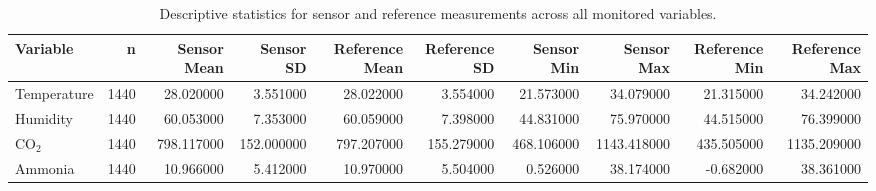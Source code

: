 \begin{table}
\caption{Descriptive statistics for sensor and reference measurements across all monitored variables.}
\label{tab:descriptive_stats}
\begin{tabular}{lrrrrrrrrr}
\toprule
Variable & n & Sensor Mean & Sensor SD & Reference Mean & Reference SD & Sensor Min & Sensor Max & Reference Min & Reference Max \\
\midrule
Temperature & 1440 & 28.020000 & 3.551000 & 28.022000 & 3.554000 & 21.573000 & 34.079000 & 21.315000 & 34.242000 \\
Humidity & 1440 & 60.053000 & 7.353000 & 60.059000 & 7.398000 & 44.831000 & 75.970000 & 44.515000 & 76.399000 \\
CO$_2$ & 1440 & 798.117000 & 152.000000 & 797.207000 & 155.279000 & 468.106000 & 1143.418000 & 435.505000 & 1135.209000 \\
Ammonia & 1440 & 10.966000 & 5.412000 & 10.970000 & 5.504000 & 0.526000 & 38.174000 & -0.682000 & 38.361000 \\
\bottomrule
\end{tabular}
\end{table}
